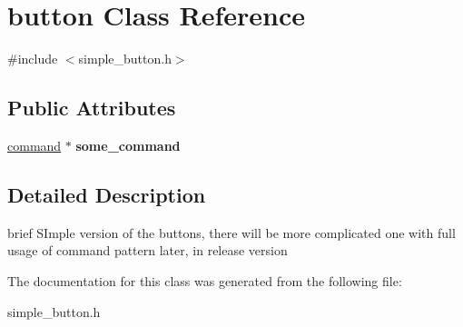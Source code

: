 \hypertarget{classbutton}{}\section{button Class Reference}
\label{classbutton}


{\ttfamily \#include $<$simple\+\_\+button.\+h$>$}

\subsection*{Public Attributes}
\begin{DoxyCompactItemize}
\item 
\mbox{\label{classbutton_aaf513af175d36f1c6a3ef3e02c91bd01}} 
\mbox{\hyperlink{classcommand}{command}} $\ast$ {\bfseries some\+\_\+command}
\end{DoxyCompactItemize}


\subsection{Detailed Description}
brief S\+Imple version of the buttons, there will be more complicated one with full usage of command pattern later, in release version 

The documentation for this class was generated from the following file\+:\begin{DoxyCompactItemize}
\item 
simple\+\_\+button.\+h\end{DoxyCompactItemize}
